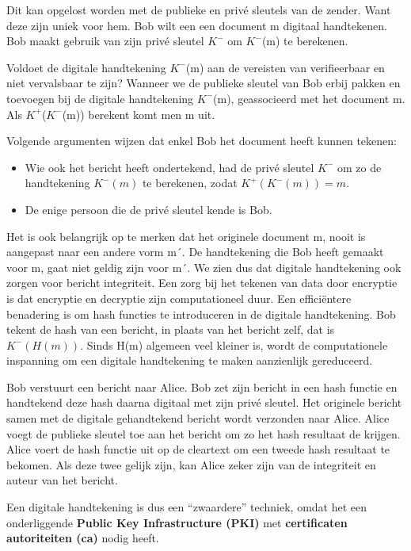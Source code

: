 \noindent Dit kan opgelost worden met de publieke en privé sleutels van de zender. Want deze zijn uniek voor hem. Bob wilt een een document m digitaal handtekenen. Bob maakt gebruik van zijn privé sleutel $K^-$ om $K^-$(m) te berekenen.

\newpage

\noindent Voldoet de digitale handtekening $K^-$(m) aan de vereisten van verifieerbaar en niet vervalsbaar te zijn? Wanneer we de publieke sleutel van Bob erbij pakken en toevoegen bij de digitale handtekening $K^-$(m), geassocieerd met het document m. Als $K^+$($K^-$(m)) berekent komt men m uit. 

\noindent Volgende argumenten wijzen dat enkel Bob het document heeft kunnen tekenen:
\begin{itemize}
\item Wie ook het bericht heeft ondertekend, had de privé sleutel $K^-$ om zo de handtekening $K^- (m)$ te berekenen, zodat $K^+(K^- (m)) = m$.
\item De enige persoon die de privé sleutel kende is Bob.
\end{itemize}
\noindent Het is ook belangrijk op te merken dat het originele document m, nooit is aangepast naar een andere vorm m´. De handtekening die Bob heeft gemaakt voor m, gaat niet geldig zijn voor m´. We zien dus dat digitale handtekening ook zorgen voor bericht integriteit.
Een zorg bij het tekenen van data door encryptie is dat encryptie en decryptie zijn computationeel duur. Een efficiëntere benadering is om hash functies te introduceren in de digitale handtekening. Bob tekent de hash van een bericht, in plaats van het bericht zelf, dat is $K^{-}(H(m))$. Sinds H(m) algemeen veel kleiner is, wordt de computationele inspanning om een digitale handtekening te maken aanzienlijk gereduceerd.

\noindent Bob verstuurt een bericht naar Alice. Bob zet zijn bericht in een hash functie en handtekend deze hash daarna digitaal met zijn privé sleutel. Het originele bericht samen met de digitale gehandtekend bericht wordt verzonden naar Alice. Alice voegt de publieke sleutel toe aan het bericht om zo het hash resultaat de krijgen. Alice voert de hash functie uit op de cleartext om een tweede hash resultaat te bekomen. Als deze twee gelijk zijn, kan Alice zeker zijn van de integriteit en auteur van het bericht.

\noindent Een digitale handtekening is dus een “zwaardere” techniek, omdat het een onderliggende \textbf{Public Key Infrastructure (PKI)} met \textbf{ certificaten autoriteiten (\acrshort{ca})} nodig heeft.

